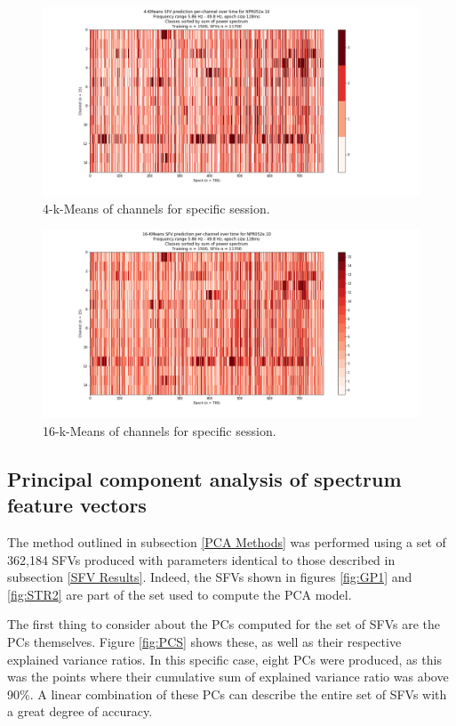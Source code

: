 \documentclass{article}
\begin{document}
\begin{figure}[H]
    \centering
    \centerline{\includegraphics[width=1\textwidth]{images/KM4.png}}
    \caption{4-k-Means of channels for specific session.}
    \label{fig:KM4}
\end{figure}

\begin{figure}[H]
    \centering
    \centerline{\includegraphics[width=1\textwidth]{images/KM16.png}}
    \caption{16-k-Means of channels for specific session.}
    \label{fig:KM16}
\end{figure}

\subsection{Principal component analysis of spectrum feature vectors}\label{PCA Results}

The method outlined in subsection \ref{PCA Methods} was performed using a set of 362,184 SFVs produced with parameters identical to those described in subsection \ref{SFV Results}.
Indeed, the SFVs shown in figures \ref{fig:GP1} and \ref{fig:STR2} are part of the set used to compute the PCA model.

The first thing to consider about the PCs computed for the set of SFVs are the PCs themselves.
Figure \ref{fig:PCS} shows these, as well as their respective explained variance ratios. 
In this specific case, eight PCs were produced, as this was the points where their cumulative sum of explained variance ratio was above 90\%.
A linear combination of these PCs can describe the entire set of SFVs with a great degree of accuracy.
\end{document}
